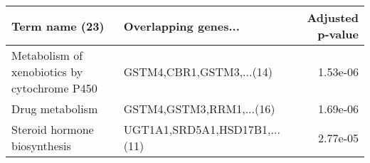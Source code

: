 \begin{tabular}{llr}
\toprule
                              Term name (23) &          Overlapping genes... &  Adjusted p-value \\
\midrule
Metabolism of xenobiotics by cytochrome P450 &      GSTM4,CBR1,GSTM3,...(14) &          1.53e-06 \\
                             Drug metabolism &      GSTM4,GSTM3,RRM1,...(16) &          1.69e-06 \\
                Steroid hormone biosynthesis & UGT1A1,SRD5A1,HSD17B1,...(11) &          2.77e-05 \\
\bottomrule
\end{tabular}
